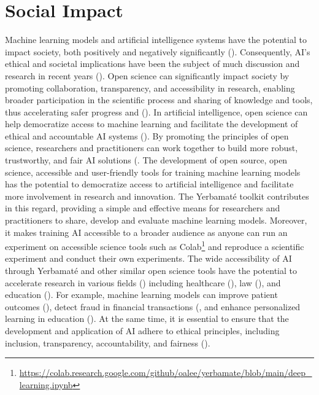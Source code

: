 \documentclass{IEEEtran}
\begin{document}
\section{Social Impact}
Machine learning models and artificial intelligence systems have the potential to impact society, both positively and negatively significantly (\cite{mittelstadt2019principles, jobin2019global,arrieta2020explainable, floridi2018ai4people}). Consequently, AI's ethical and societal implications have been the subject of much discussion and research in recent years (\cite{floridi2018ai4people, goodman2017european, floridi2019establishing, mittelstadt2016ethics}).
Open science can significantly impact society by promoting collaboration, transparency, and accessibility in research, enabling broader participation in the scientific process and sharing of knowledge and tools, thus accelerating safer progress and (\cite{kocak2022transparency, wachter2017transparent, coro2020open, braun2018open, paton2019open, goodman2017european}). In artificial intelligence, open science can help democratize access to machine learning and facilitate the development of ethical and accountable AI systems (\cite{goodman2017european, batarseh2020data}). By promoting the principles of open science, researchers and practitioners can work together to build more robust, trustworthy, and fair AI solutions (\cite{accountabilityInAi, kocak2022transparency,wachter2017transparent, coro2020open, braun2018open, hicks2021open, goodman2017european}.
The development of open source, open science, accessible and user-friendly tools for training machine learning models has the potential to democratize access to artificial intelligence and facilitate more involvement in research and innovation. The Yerbamaté toolkit contributes in this regard, providing a simple and effective means for researchers and practitioners to share, develop and evaluate machine learning models. Moreover, it makes training AI accessible to a broader audience as anyone can run an experiment on accessible science tools such as Colab\footnote{\url{https://colab.research.google.com/github/oalee/yerbamate/blob/main/deep_learning.ipynb}} and reproduce a scientific experiment and conduct their own experiments.
The wide accessibility of AI through Yerbamaté and other similar open science tools have the potential to accelerate research in various fields (\cite{olson2018system, wolf2020designing,morris2020ai,ong2021guide, li2018can}) including healthcare (\cite{haristiani2020combining}), law (\cite{ashley2017legal}), and education (\cite{goel2020ai}). For example, machine learning models can improve patient outcomes (\cite{hamet2017medicine}), detect fraud in financial transactions (\cite{bao2022fraudartificial}, and enhance personalized learning in education (\cite{haristiani2020combining, goel2020ai}). At the same time, it is essential to ensure that the development and application of AI adhere to ethical principles, including inclusion, transparency, accountability, and fairness (\cite{ accountabilityInAi,  jobin2019global, floridi2018ai4people, wachter2017transparent, arrieta2020explainable, mittelstadt2019principles, goodman2017european, mittelstadt2016ethics, floridi2019establishing, o2017weapons}).
\end{document}
